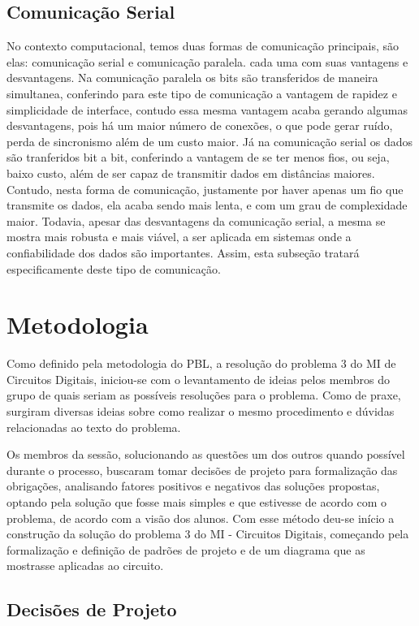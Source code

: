 \documentclass[12pt]{article}
\begin{document}
\subsection{Comunicação Serial}
No contexto computacional, temos duas formas de comunicação principais, são elas: comunicação serial e comunicação paralela. cada uma com suas vantagens e desvantagens. Na comunicação paralela os bits são transferidos de maneira simultanea, conferindo para este tipo de comunicação a vantagem de rapidez e simplicidade de interface, contudo essa mesma vantagem acaba gerando algumas desvantagens, pois há um maior número de conexões, o que pode gerar ruído, perda de sincronismo além de um custo maior. Já na comunicação serial os dados são tranferidos  bit a bit, conferindo a vantagem de se ter menos fios, ou seja, baixo custo, além de ser capaz de transmitir dados em distâncias maiores. Contudo, nesta forma de comunicação, justamente por haver apenas um fio que transmite os dados, ela acaba sendo mais lenta, e com um grau de complexidade maior. Todavia, apesar das desvantagens da comunicação serial, a mesma se mostra mais robusta e mais viável, a ser aplicada em sistemas onde a confiabilidade dos dados são importantes. Assim, esta subseção tratará especificamente deste tipo de comunicação. 


\section{Metodologia}
Como definido pela metodologia do PBL, a resolução do problema 3 do MI de Circuitos Digitais, iniciou-se com o levantamento de ideias pelos membros do grupo de quais seriam as possíveis resoluções para o problema. Como de praxe, surgiram diversas ideias sobre como realizar o mesmo procedimento e dúvidas relacionadas ao texto do problema. 

Os membros da sessão, solucionando as questões um dos outros quando possível durante o processo, buscaram tomar decisões de projeto para formalização das obrigações, analisando fatores positivos e negativos das soluções propostas, optando pela solução que fosse mais simples e que estivesse de acordo com o problema, de acordo com a visão dos alunos. Com esse método deu-se início a construção da solução do problema 3 do MI - Circuitos Digitais, começando pela formalização e definição de padrões de projeto e de um diagrama que as mostrasse aplicadas ao circuito.

\subsection{Decisões de Projeto}
\end{document}
